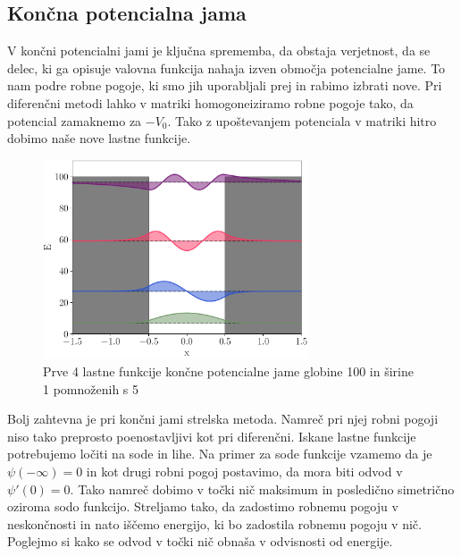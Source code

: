\documentclass{article}
\begin{document}
\subsection{Končna potencialna jama}
V končni potencialni jami je ključna sprememba, da obstaja verjetnost, da se delec, ki ga opisuje valovna funkcija nahaja izven območja potencialne jame. To nam podre robne pogoje, ki smo jih uporabljali prej in rabimo izbrati nove. Pri diferenčni metodi lahko v matriki homogoneiziramo robne pogoje tako, da potencial zamaknemo za $-V_0$. Tako z upoštevanjem potenciala v matriki hitro dobimo naše nove lastne funkcije.
\begin{figure}[H]
	\centering
	\includegraphics[width=0.7\textwidth]{finiteeigen.pdf}
	\caption{Prve 4 lastne funkcije končne potencialne jame globine 100 in širine 1 pomnoženih s 5}
\end{figure}
Bolj zahtevna je pri končni jami strelska metoda. Namreč pri njej robni pogoji niso tako preprosto poenostavljivi kot pri diferenčni. Iskane lastne funkcije potrebujemo ločiti na sode in lihe. Na primer za sode funkcije vzamemo da je $\psi(-\infty)=0$ in kot drugi robni pogoj postavimo, da mora biti odvod v $\psi'(0)=0$. Tako namreč dobimo v točki nič maksimum in posledično simetrično oziroma sodo funkcijo. 
Streljamo tako, da zadostimo robnemu pogoju v neskončnosti in nato iščemo energijo, ki bo zadostila robnemu pogoju v nič. Poglejmo si kako se odvod v točki nič obnaša v odvisnosti od energije.
\end{document}
